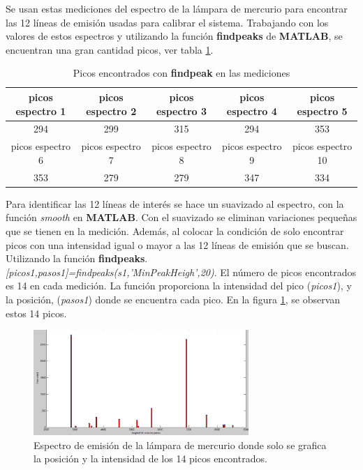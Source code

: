 Se usan estas mediciones del espectro de la lámpara de mercurio para encontrar las 12 líneas de emisión usadas para calibrar el sistema.
Trabajando con los valores de estos espectros y utilizando la función \textbf{findpeaks} de \textbf{MATLAB}, se encuentran una gran cantidad  picos, ver tabla \ref{tabla:picos01}. 
\begin{table}[h]
	\centering
	\caption{Picos encontrados con \textbf{findpeak} en las mediciones}
	\label{tabla:picos01}
\begin{tabular}{|c|c|c|c|c|}
	\hline 
	picos espectro 1 & picos espectro 2 & picos espectro 3 & picos espectro 4 & picos espectro 5 \\ 
	\hline 
	294 & 299 & 315 & 294 & 353 \\ 
	\hline 
	picos espectro 6 & picos espectro 7 & picos espectro 8 & picos espectro 9 & picos espectro 10 \\ 
	\hline 
	353 & 279 & 279 & 347 & 334 \\ 
	\hline 
\end{tabular} 

\end{table}

Para identificar las 12 líneas de interés se hace un suavizado al espectro, con la función \textit{smooth} en \textbf{MATLAB}. Con el suavizado se eliminan variaciones pequeñas que se tienen en la medición. Además, al colocar la condición de solo encontrar picos con una intensidad igual o mayor a las 12 líneas de emisión que se buscan. Utilizando la función \textbf{findpeaks}. \textit{[picos1,pasos1]=findpeaks(s1,'MinPeakHeigh',20)}. El número de picos encontrados es 14 en cada medición. La función proporciona la intensidad del pico (\textit{picos1}), y la posición, (\textit{pasos1}) donde se encuentra cada pico. 
En la figura \ref{fig:picos14}, se observan estos 14 picos.

\begin{figure}[h]
	\centering
	\includegraphics[width=0.7\linewidth, height=4cm]{Imagenes/3/picos14}
	
	\caption[Espectro de emisión de la lámpara de mercurio, espectro en intensidad contra pasos.]{Espectro de emisión de la lámpara de mercurio donde solo se grafica la posición y la intensidad de los 14 picos encontrados.}
	\label{fig:picos14}
\end{figure}

